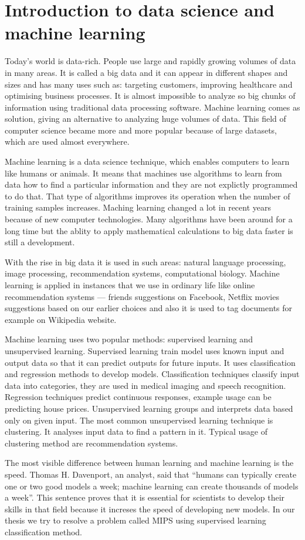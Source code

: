 \section{Introduction to data science and machine learning}

Today’s world is data-rich. 
People use large and rapidly growing volumes of data in many areas. 
It is called a big data and it can appear in different shapes and sizes and has many uses such as: targeting customers, improving healthcare and optimising business processes. 
It is almost impossible to analyze so big chunks of information using traditional data processing software.
Machine learning comes as solution, giving an alternative to analyzing huge volumes of data.
This field of computer science became more and more popular because of large datasets, which are used almost everywhere.

Machine learning is a data science technique, which enables computers to learn like humans or animals.
It means that machines use algorithms to learn from data how to find a particular information and
they are not explictly programmed to do that.
That type of algorithms improves its operation when the number of training samples increases.
Maching learning changed a lot in recent years because of new computer technologies.
Many algorithms have been around for a long time but the ablity to apply mathematical calculations to big data faster is still a development.

With the rise in big data it is used in such areas: natural language processing, image processing, recommendation systems, computational biology. Machine learning is applied in instances that we use in ordinary life like online recommendation systems --- friends suggestions on Facebook, Netflix movies suggestions based on our earlier choices and also it is used to tag documents for example on Wikipedia website.

Machine learning uses two popular methods: supervised learning and unsupervised learning.
Supervised learning train model uses known input and output data so that it can predict outputs for future inputs.
It uses classification and regression methods to develop models.
Classification techniques classify input data into categories, they are used in medical imaging and speech recognition.
Regression techniques predict continuous responses, example usage can be predicting house prices. Unsupervised learning groups and interprets data based only on given input.
The most common unsupervised learning technique is clustering.
It analyses input data to find a pattern in it. Typical usage of clustering method are recommendation systems. 

The most visible difference between human learning and machine learning is the speed. 
Thomas H. Davenport, an analyst, said that ``humans can typically create one or two good models a week; machine learning can create thousands of models a week''. \cite{machine_learning}
This sentence proves that it is essential for scientists to develop their skills in that field because it increses the speed of developing new models.
In our thesis we try to resolve a problem called MIPS using supervised learning classification method.
